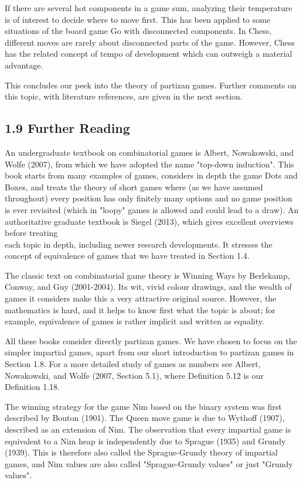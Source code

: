 \documentclass[12pt]{article}
\begin{document}
If there are several hot components in a game sum, analyzing their temperature is of interest to decide where to move first. This has been applied to some situations of the board game Go with disconnected components. In Chess, different moves are rarely about disconnected parts of the game. However, Chess has the related concept of tempo of development which can outweigh a material advantage.

This concludes our peek into the theory of partizan games. Further comments on this topic, with literature references, are given in the next section.

\subsection*{1.9 Further Reading}
An undergraduate textbook on combinatorial games is Albert, Nowakowski, and Wolfe (2007), from which we have adopted the name "top-down induction". This book starts from many examples of games, considers in depth the game Dots and Boxes, and treats the theory of short games where (as we have assumed throughout) every position has only finitely many options and no game position is ever revisited (which in "loopy" games is allowed and could lead to a draw). An authoritative graduate textbook is Siegel (2013), which gives excellent overviews before treating\\
each topic in depth, including newer research developments. It stresses the concept of equivalence of games that we have treated in Section 1.4.

The classic text on combinatorial game theory is Winning Ways by Berlekamp, Conway, and Guy (2001-2004). Its wit, vivid colour drawings, and the wealth of games it considers make this a very attractive original source. However, the mathematics is hard, and it helps to know first what the topic is about; for example, equivalence of games is rather implicit and written as equality.

All these books consider directly partizan games. We have chosen to focus on the simpler impartial games, apart from our short introduction to partizan games in Section 1.8. For a more detailed study of games as numbers see Albert, Nowakowski, and Wolfe (2007, Section 5.1), where Definition 5.12 is our Definition 1.18.

The winning strategy for the game Nim based on the binary system was first described by Bouton (1901). The Queen move game is due to Wythoff (1907), described as an extension of Nim. The observation that every impartial game is equivalent to a Nim heap is independently due to Sprague (1935) and Grundy (1939). This is therefore also called the Sprague-Grundy theory of impartial games, and Nim values are also called "Sprague-Grundy values" or just "Grundy values".
\end{document}

